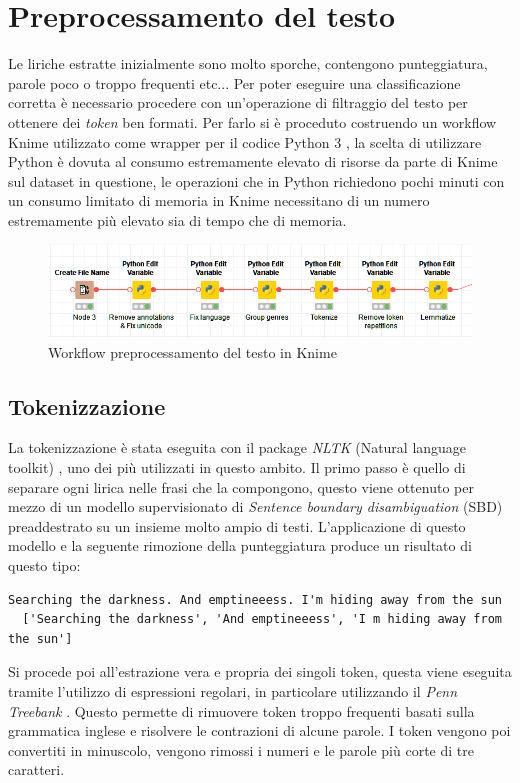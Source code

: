 \documentclass[technote]{IEEEtran}
\begin{document}
\section{Preprocessamento del testo}
Le liriche estratte inizialmente sono molto sporche, contengono punteggiatura, parole poco o troppo frequenti etc... Per poter eseguire una classificazione corretta è necessario procedere con un'operazione di filtraggio del testo per ottenere dei \textit{token} ben formati. Per farlo si è proceduto costruendo un workflow Knime \cite{10.1007/978-3-540-78246-9_38} utilizzato come wrapper per il codice Python 3 \cite{10.5555/1593511}, la scelta di utilizzare Python è dovuta al consumo estremamente elevato di risorse da parte di Knime sul dataset in questione, le operazioni che in Python richiedono pochi minuti con un consumo limitato di memoria in Knime necessitano di un numero estremamente più elevato sia di tempo che di memoria.
\begin{figure}[H]
\centerline{\includegraphics[width=1\columnwidth]{images/knime-text-prep}}
\caption{Workflow preprocessamento del testo in Knime}
\label{fig_knime_prep}
\end{figure}
\subsection{Tokenizzazione}
La tokenizzazione è stata eseguita con il package \textit{NLTK} (Natural language toolkit) \cite{Loper02nltk:the}, uno dei più utilizzati in questo ambito. Il primo passo è quello di separare ogni lirica nelle frasi che la compongono, questo viene ottenuto per mezzo di un modello supervisionato di \textit{Sentence boundary disambiguation} (SBD) preaddestrato su un insieme molto ampio di testi. L'applicazione di questo modello e la seguente rimozione della punteggiatura produce un risultato di questo tipo:

\begin{lstlisting}[basicstyle=\tiny]
  Searching the darkness. And emptineeess. I'm hiding away from the sun  
  ['Searching the darkness', 'And emptineeess', 'I m hiding away from the sun']  
\end{lstlisting}
Si procede poi all'estrazione vera e propria dei singoli token, questa viene eseguita tramite l'utilizzo di espressioni regolari, in particolare utilizzando il \textit{Penn Treebank} \cite{marcus-etal-1993-building}. Questo permette di rimuovere token troppo frequenti basati sulla grammatica inglese e risolvere le contrazioni di alcune parole. I token vengono poi convertiti in minuscolo, vengono rimossi i numeri e le parole più corte di tre caratteri.
\end{document}
